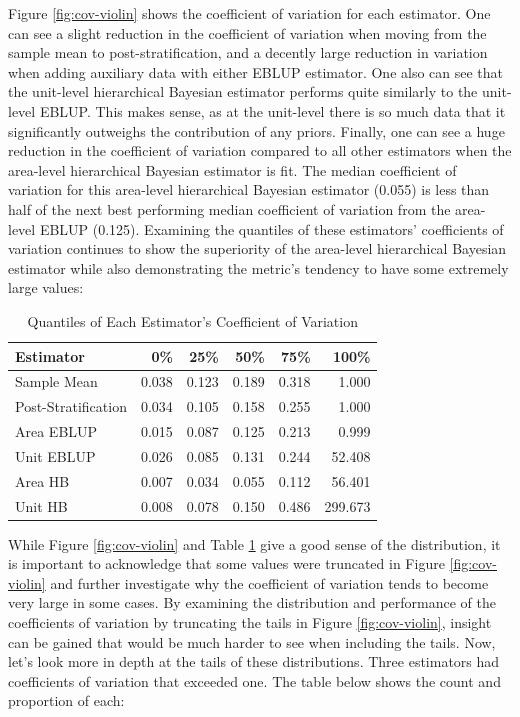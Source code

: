 \documentclass[12pt,twoside]{reedthesis}
\begin{document}
Figure \ref{fig:cov-violin} shows the coefficient of variation for each estimator. One can see a slight reduction in the coefficient of variation when moving from the sample mean to post-stratification, and a decently large reduction in variation when adding auxiliary data with either EBLUP estimator. One also can see that the unit-level hierarchical Bayesian estimator performs quite similarly to the unit-level EBLUP. This makes sense, as at the unit-level there is so much data that it significantly outweighs the contribution of any priors. Finally, one can see a huge reduction in the coefficient of variation compared to all other estimators when the area-level hierarchical Bayesian estimator is fit. The median coefficient of variation for this area-level hierarchical Bayesian estimator (0.055) is less than half of the next best performing median coefficient of variation from the area-level EBLUP (0.125). Examining the quantiles of these estimators' coefficients of variation continues to show the superiority of the area-level hierarchical Bayesian estimator while also demonstrating the metric's tendency to have some extremely large values:
\begin{longtable}[t]{lrrrrr}
\caption[Coefficient of Variation Quantiles]{\label{tab:quantile-table}Quantiles of Each Estimator's Coefficient of Variation}\\
\toprule
Estimator & 0\% & 25\% & 50\% & 75\% & 100\%\\
\midrule
Sample Mean & 0.038 & 0.123 & 0.189 & 0.318 & 1.000\\
Post-Stratification & 0.034 & 0.105 & 0.158 & 0.255 & 1.000\\
Area EBLUP & 0.015 & 0.087 & 0.125 & 0.213 & 0.999\\
Unit EBLUP & 0.026 & 0.085 & 0.131 & 0.244 & 52.408\\
Area HB & 0.007 & 0.034 & 0.055 & 0.112 & 56.401\\
\addlinespace
Unit HB & 0.008 & 0.078 & 0.150 & 0.486 & 299.673\\
\bottomrule
\end{longtable}
While Figure \ref{fig:cov-violin} and Table \ref{tab:quantile-table} give a good sense of the distribution, it is important to acknowledge that some values were truncated in Figure \ref{fig:cov-violin} and further investigate why the coefficient of variation tends to become very large in some cases. By examining the distribution and performance of the coefficients of variation by truncating the tails in Figure \ref{fig:cov-violin}, insight can be gained that would be much harder to see when including the tails. Now, let's look more in depth at the tails of these distributions. Three estimators had coefficients of variation that exceeded one. The table below shows the count and proportion of each:
\end{document}
